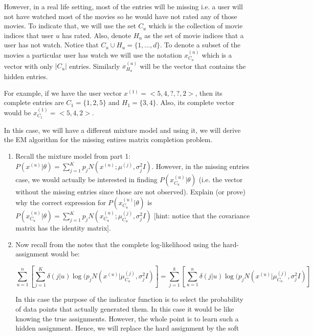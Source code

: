 \begin{enumerate}
However, in a real life setting, most of the entries will be missing i.e. a user will not have watched most of the movies so he would have not rated any of those movies. To indicate that, we will use the set $C_{u}$ which is the collection of movie indices that user $u$ has rated. Also, denote $H_{u}$ as the set of movie indices that a user has not watch. Notice that $C_{u} \cup H_{u} = \{1, ... , d \}$. To denote a subset of the movies a particular user has watch we will use the notation $x^{(u)}_{C_u}$ which is a vector with only $|C_u|$ entries. Similarly $x^{(u)}_{H_u}$ will be the vector that contains the hidden entries.

For example, if we have the user vector $x^{(1)} = < 5, 4, ?, ?, 2>$, then its complete entries are $C_{1} = \{ 1, 2, 5\}$ and $H_{1} = \{ 3, 4\}$. Also, its complete vector would be $x^{(1)}_{C_1} = < 5, 4, 2>$.

In this case, we will have a different mixture model and using it, we will derive the EM algorithm for the missing entires matrix completion problem.

\begin{enumerate}

\item Recall the mixture model from part 1: $P(x^{(u)} | \theta) = \sum^{K}_{j=1} p_j N(x^{(u)}; \mu^{(j)}, \sigma^2_j I) $. However, in the missing entries case, we would actually be interested in finding $P(x^{(u)}_{C_u} | \theta)$ (i.e. the vector without the missing entries since those are not observed). Explain (or prove) why the correct expression for $P(x^{(u)}_{C_u} | \theta)$ is$P(x^{(u)}_{C_u}  | \theta) = \sum^{K}_{j=1} p_j N(x^{(u)}_{C_u} ; \mu^{(j)}_{C_u} , \sigma^2_j I) $ [hint: notice that the covariance matrix has the identity matrix].

\item Now recall from the notes that the complete log-likelihood using the hard-assignment would be:

$$ \sum^n_{u=1} \left[ \sum^{K}_{j=1} \delta(j|u) \log( p_j N(x^{(u)} | \mu^{(j)}_{C_u}, \sigma^2_j I) \right] = \sum^k_{j=1} \left[ \sum^{n}_{u=1} \delta(j|u) \log( p_j N(x^{(u)} | \mu^{(j)}_{C_u}, \sigma^2_j I) \right]$$

In this case the purpose of the indicator function is to select the probability of data points that actually generated them. In this case it would be like knowing the true assignments. However, the whole point is to learn such a hidden assignment. Hence, we will replace the hard assignment by the soft

\end{enumerate} 


\end{enumerate}





